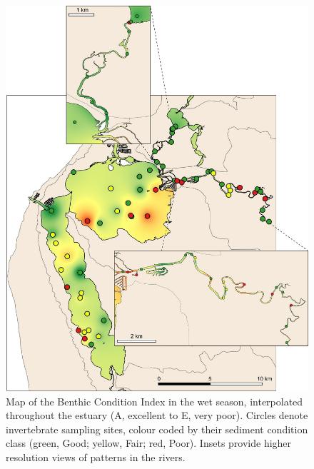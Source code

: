 \documentclass[
]{book}
\begin{document}
\begin{figure}
\includegraphics[width=1\linewidth]{images/BMI/picture13} \caption{Map of the Benthic Condition Index in the wet season, interpolated throughout the estuary (A, excellent to E, very poor). Circles denote invertebrate sampling sites, colour coded by their sediment condition class (green, Good; yellow, Fair; red, Poor). Insets provide higher resolution views of patterns in the rivers.}\label{fig:BMI-pic13}
\end{figure}
\end{document}
